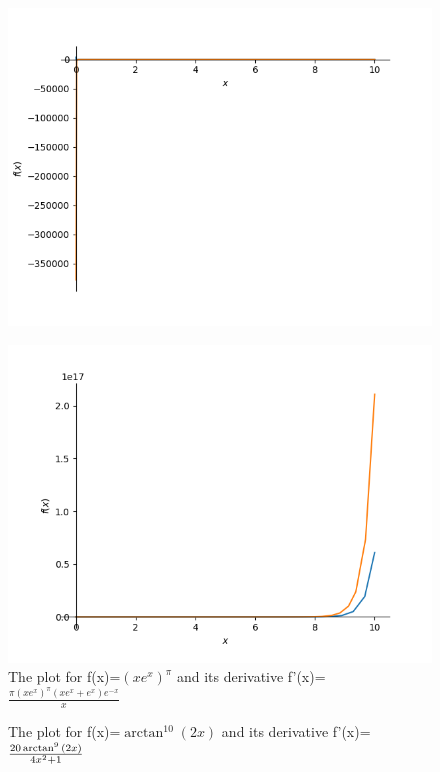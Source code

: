 \documentclass{article}
\begin{document}
\begin{figure}
\includegraphics{plot_18}
\end{figure}\begin{figure}
\caption{The plot for f(x)=$\left(x e^{x}\right)^{\pi}$ and its derivative f'(x)=$\frac{\pi \left(x e^{x}\right)^{\pi} \left(x e^{x} + e^{x}\right) e^{- x}}{x}$}
\centering
\includegraphics{plot_19}
\end{figure}\begin{figure}
\caption{The plot for f(x)=$\operatorname{\arctan}^{10}{\left(2 x \right)}$ and its derivative f'(x)=$\frac{20 \operatorname{\\arctan}^{9}{\left(2 x \right)}}{4 x^{2} + 1}$}
\centering

\end{figure}
\end{document}
